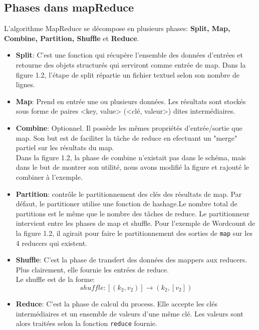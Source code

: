 \subsection{Phases dans mapReduce}
L'algorithme MapReduce se décompose en plusieurs phases: {\bf Split, Map, Combine, Partition, Shuffle} et {\bf Reduce}.\\
\begin{itemize}
\item {\bf Split}: C'est une fonction qui récupère l'ensemble des données d'entrées et retourne des objets structurés qui serviront comme entrée de map. Dans la figure 1.2, l'étape de split répartie un fichier textuel selon son nombre de lignes.

\item {\bf Map}: Prend en entrée une ou plusieurs données. Les résultats sont stockés sous forme de paires <key, value> (<clé, valeur>) dites intermédiaires.

\item {\bf Combine}: Optionnel. Il possède les mêmes propriétés d'entrée/sortie que map. Son but est de faciliter la tâche de reduce en efectuant un "merge" partiel\cite{Google} sur les résultats du map.\\
Dans la figure 1.2, la phase de combine n'existait pas dans le schéma, mais dans le but de montrer son utilité, nous avons modifié la figure et rajouté le combiner à l'exemple.

\item {\bf Partition}: contrôle le partitionnement des clés des résultats de map. Par défaut, le partitioner utilise une fonction de hashage.Le nombre total de partitions est le même que le nombre des tâches de reduce. Le partitionneur intervient entre les phases de map et shuffle. Pour l'exemple de Wordcount de la figure 1.2, il agirait pour faire le partitionnement des sorties de {\tt map} sur les 4 reducers qui existent.


\item {\bf Shuffle}: C'est la phase de transfert des données des mappers aux reducers. Plus clairement, elle fournie les entrées de reduce.\\
Le shuffle est de la forme:
\[  shuffle:[(k_2,v_2)] \rightarrow (k_2,[v_2]) \]


\item {\bf Reduce}: C'est la phase de calcul du process. Elle accepte les clés intermédiaires et un ensemble de valeurs d'une même clé. Les valeurs sont alors traitées selon la fonction {\tt reduce} fournie.\\
\end{itemize}

